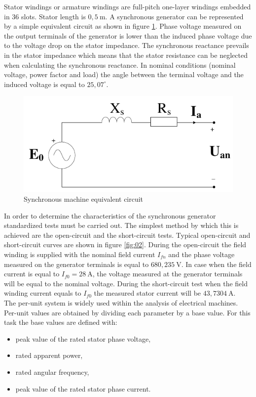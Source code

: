 \documentclass[class=article, crop=false]{standalone}
\begin{document}
Stator windings or armature windings are full-pitch one-layer windings embedded in 36 slots. Stator length is $0,5\ \mathrm{m}$. A synchronous generator can be represented by a simple equivalent circuit as shown in figure \ref{fig:01}. Phase voltage measured on the output terminals of the generator is lower than the induced phase voltage due to the voltage drop on the stator impedance. The synchronous reactance prevails in the stator impedance which means that the stator resistance can be neglected when calculating the synchronous reactance. In nominal conditions (nominal voltage, power factor and load) the angle between the terminal voltage and the induced voltage is equal to $25,07^{\circ}$.
\begin{figure}[!htb]
			\centering
			\includegraphics{EquivalentCircuit.pdf}
			\caption{Synchronous machine equivalent circuit}
			\label{fig:01}
\end{figure}
In order to determine the characteristics of the synchronous generator standardized tests must be carried out. The simplest method by which this is achieved are the open-circuit and the short-circuit tests. Typical open-circuit and short-circuit curves are shown in figure \ref{fig:02}. During the open-circuit the field winding is supplied with the nominal field current $I_{fn}$ and the phase voltage measured on the generator terminals is equal to $680,235\ \mathrm{V}$. In case when the field current is equal to $I_{f0} = 28 \ \mathrm{A}$, the voltage measured at the generator terminals will be equal to the nominal voltage. During the short-circuit test when the field winding current equals to $I_{f0}$ the measured stator current will be $43, 7304\ \mathrm{A}$. 
\\The per-unit system is widely used within the analysis of electrical machines. Per-unit values are obtained by dividing each parameter by a base value. For this task the base values are defined with:
\begin{itemize}
    \item peak value of the rated stator phase voltage,
    \item rated apparent power,
    \item rated angular frequency,
    \item peak value of the rated stator phase current.
\end{itemize}
\end{document}
